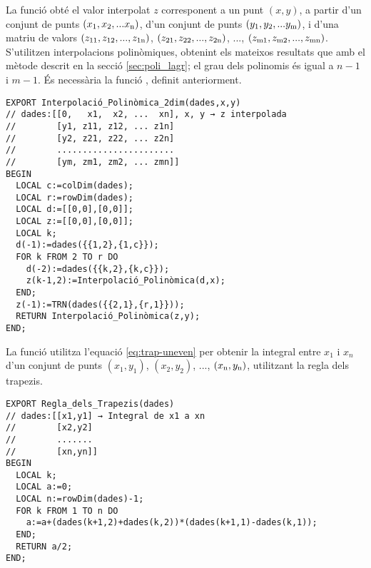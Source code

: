 La funció  obté el valor interpolat $z$ corresponent a un punt $(x, y)$, a partir d'un conjunt de punts $(x_\mathrm{1}, x_\mathrm{2}, ... x_\mathrm{n})$, d'un conjunt de punts $(y_\mathrm{1}, y_\mathrm{2}, ... y_\mathrm{m})$, i d'una matriu de valors $(z_\mathrm{11}, z_\mathrm{12}, ..., z_\mathrm{1n})$,
$(z_\mathrm{21}, z_\mathrm{22}, ..., z_\mathrm{2n})$, ..., $(z_\mathrm{m1}, z_\mathrm{m2}, ..., z_\mathrm{mn})$. S'utilitzen  interpolacions polinòmiques, obtenint els mateixos resultats que amb el mètode descrit en la secció \vref{sec:poli_lagr}; el grau dels polinomis és igual a $n-1$ i $m-1$.
És necessària la funció , definit anteriorment.

\begin{lstlisting}[caption={HP Prime --- Funció Interpolació\_Polinòmica\_2dim}]
EXPORT Interpolació_Polinòmica_2dim(dades,x,y)
// dades:[[0,   x1,  x2, ...  xn], x, y → z interpolada
//        [y1, z11, z12, ... z1n]
//        [y2, z21, z22, ... z2n]
//        .......................
//        [ym, zm1, zm2, ... zmn]]
BEGIN
  LOCAL c:=colDim(dades);
  LOCAL r:=rowDim(dades);
  LOCAL d:=[[0,0],[0,0]];
  LOCAL z:=[[0,0],[0,0]];
  LOCAL k;
  d(-1):=dades({{1,2},{1,c}});
  FOR k FROM 2 TO r DO
    d(-2):=dades({{k,2},{k,c}});
    z(k-1,2):=Interpolació_Polinòmica(d,x);
  END;
  z(-1):=TRN(dades({{2,1},{r,1}}));
  RETURN Interpolació_Polinòmica(z,y);
END;
\end{lstlisting}

La funció  utilitza l'equació  \eqref{eq:trap-uneven} per obtenir la integral entre $x_1$ i $x_n$ d'un conjunt  de punts $(x_1,y_1)$, $(x_2,y_2)$, ..., $(x_\mathrm{n},y_\mathrm{n})$, utilitzant la regla dels trapezis.

\begin{lstlisting}[caption={HP Prime --- Funció Regla\_dels\_Trapezis}]
EXPORT Regla_dels_Trapezis(dades)
// dades:[[x1,y1] → Integral de x1 a xn
//        [x2,y2]
//        .......
//        [xn,yn]]
BEGIN
  LOCAL k;
  LOCAL a:=0;
  LOCAL n:=rowDim(dades)-1;
  FOR k FROM 1 TO n DO
    a:=a+(dades(k+1,2)+dades(k,2))*(dades(k+1,1)-dades(k,1));
  END;
  RETURN a/2;
END;
\end{lstlisting}




